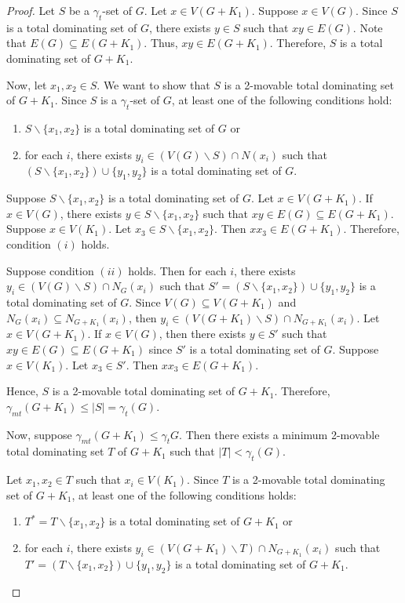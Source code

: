 \documentclass[twoside,12pt]{article}
\begin{document}
\begin{proof}
	Let $S$ be a $\gamma_t$-set of $G$. Let $x \in V(G+K_1)$. Suppose $x \in V(G)$. Since $S$ is a total dominating set of $G$, there exists $y \in S$ such that $xy \in E(G)$. Note that $E(G) \subseteq E(G+K_1)$. Thus, $xy \in E(G+K_1)$. Therefore, $S$ is a total dominating set of $G+K_1$.
	
	Now, let $x_1, x_2 \in S$. We want to show that $S$ is a 2-movable total dominating set of $G+K_1$. Since $S$ is a $\gamma_t$-set of $G$, at least one of the following conditions hold:
	\begin{enumerate}
		\item[(i)] $S \backslash \{x_1, x_2\}$ is a total dominating set of $G$ or
		\item[(ii)] for each $i$, there exists $y_i \in (V(G) \backslash S) \cap N(x_i)$ such that $(S \backslash \{x_1, x_2\}) \cup \{y_1, y_2\}$ is a total dominating set of $G$.
	\end{enumerate}	 
	
	Suppose $S \backslash \{x_1,x_2\}$ is a total dominating set of $G$. Let $x \in V(G+K_1)$. If $x \in V(G)$, there exists $y \in S \backslash \{x_1,x_2\}$ such that $xy \in E(G) \subseteq E(G+K_1)$. Suppose $x \in V(K_1)$. Let $x_3 \in S \backslash \{x_1,x_2\}$. Then $xx_3 \in E(G+K_1)$. Therefore, condition $(i)$ holds.
	
	Suppose condition $(ii)$ holds. Then for each $i$, there exists\\
	$y_i \in (V(G) \backslash S) \cap N_G(x_i)$ such that $S'=(S \backslash \{x_1, x_2\}) \cup \{y_1, y_2\}$ is a total dominating set of $G$. Since $V(G) \subseteq V(G+K_1)$ and $N_G(x_i) \subseteq N_{G+K_1} (x_i)$, then $y_i \in (V(G+K_1) \backslash S) \cap N_{G+K_1}(x_i)$. Let $x \in V(G+K_1)$. If $x \in V(G)$, then there exists $y \in S'$ such that $xy \in E(G) \subseteq E(G+K_1)$ since $S'$ is a total dominating set of $G$. Suppose $x \in V(K_1)$. Let $x_3 \in S'$. Then $xx_3 \in E(G+K_1)$. 
	
	Hence, $S$ is a 2-movable total dominating set of $G+K_1$. Therefore,\\
	$\gamma_{mt} (G+K_1) \leq |S|=\gamma_t (G)$.
	
	Now, suppose $\gamma_{mt} (G+K_1) \leq \gamma_t G$. Then there exists a minimum 2-movable total dominating set $T$ of $G+K_1$ such that $|T| < \gamma_t (G)$.
	
	Let $x_1, x_2 \in T$ such that $x_i \in V(K_1)$. Since $T$ is a 2-movable total dominating set of $G+K_1$, at least one of the following conditions holds:
	\begin{enumerate}
		\item[(i)] $T^* = T \backslash \{x_1, x_2\}$ is a total dominating set of $G+K_1$ or
		\item[(ii)] for each $i$, there exists $y_i \in (V(G+K_1) \backslash T) \cap N_{G+K_1}(x_i)$ such that\\
		$T' = (T \backslash \{x_1, x_2\}) \cup \{y_1, y_2\}$ is a total dominating set of $G+K_1$.
	\end{enumerate}	
	

\end{proof}
\end{document}
